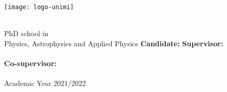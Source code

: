 


\begin{center}

	\hspace*{-15pt}
	\texttt{[image: logo-unimi]}
	\vspace*{100pt}
	{\Huge \\\myTitle}
	
	\vspace*{30pt}
	\myDepartment\\
	PhD school in\\
	Physics, Astrophysics and Applied Physics
	\vfill
	\textbf{Candidate:} \hfill \textbf{Supervisor:}\\
	\myName \hfill \myProf\\
	\vspace*{5pt}
	\hfill \textbf{Co-supervisor:}\\
	\hfill \myOtherProf\\
	\vspace*{15pt}
	Academic Year 2021/2022
\end{center}
	
	

\cleardoublepage
